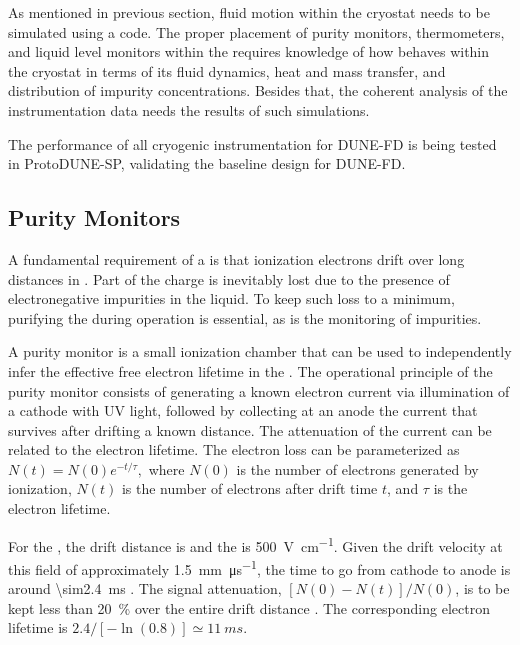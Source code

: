 As mentioned in previous section, fluid motion within the cryostat needs to be simulated using a  code.
The proper placement of purity monitors, thermometers, and liquid level monitors within the  requires knowledge of how  behaves within the cryostat in terms of its fluid dynamics, heat and mass transfer, and distribution of impurity concentrations. Besides that, the coherent analysis of the instrumentation data needs the results of such simulations.

The performance of all cryogenic instrumentation for DUNE-FD is being tested in ProtoDUNE-SP, validating the baseline design for DUNE-FD.



\subsection{Purity Monitors}
\label{sec:fdgen-slow-cryo-purity-mon}

A fundamental requirement of a   is that ionization electrons drift over long distances in . Part of the charge is inevitably lost due to the presence of electronegative impurities in the liquid. To keep such loss to a minimum, purifying the  during operation is essential, as is the monitoring of impurities.




A purity monitor is a small ionization chamber that can be used to independently  infer the effective free electron lifetime in the \lartpc.  The operational principle of the purity monitor consists of generating a known electron current via illumination of a cathode with UV light, followed by collecting at an anode the current that survives after drifting a known distance.  The  attenuation of the current can be related to the electron lifetime.
The electron loss can be parameterized as
%
\(N(t) = N(0)e^{-t/\tau},\)
%
where $N(0)$ is the number of electrons generated by ionization, $N(t)$ is the number of electrons after drift time $t$, and $\tau$ is the electron lifetime. 

For the , the drift distance is \spmaxdrift and the \efield is \SI{500}{\volt\per\centi\meter}. Given the drift velocity at this field of approximately \SI{1.5}{\milli\meter\per\micro\second}, the time to go from cathode to anode is around \SI{\sim2.4}{\milli\second} \cite{Walkowiak:2000wf}.
The   signal attenuation, \([N(0)-N(t)]/N(0)\), is to be kept less than \SI{20}{\percent} over the entire drift distance \cite{fdtf-final-report}. The corresponding electron lifetime is $2.4/[-\ln(0.8)] \simeq \SI{11}{ms}$.

